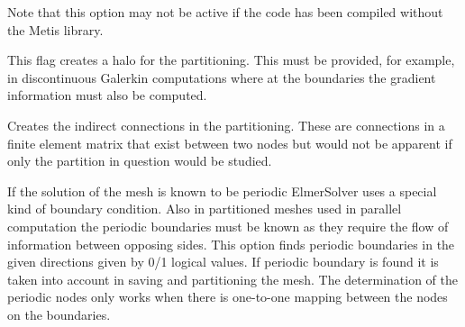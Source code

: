 Note that this option may not be active if the code has been compiled
without the Metis library.

This flag creates a halo for the partitioning. This must be provided, for example, in
discontinuous Galerkin computations where at the boundaries the gradient information 
must also be computed. 

Creates the indirect connections in the partitioning. These are connections in 
a finite element matrix that exist between two nodes but would not be apparent if
only the partition in question would be studied.  

If the solution of the mesh is known to be periodic ElmerSolver uses
a special kind of boundary condition. Also in partitioned meshes
used in parallel computation the periodic boundaries must be known
as they require the flow of information between opposing sides.
This option finds periodic boundaries in the given directions 
given by 0/1 logical values. If periodic boundary is found it is taken into
account in saving and partitioning the mesh.
The determination of the periodic nodes only works when there is one-to-one mapping
between the nodes on the boundaries. 
%

\sifend



